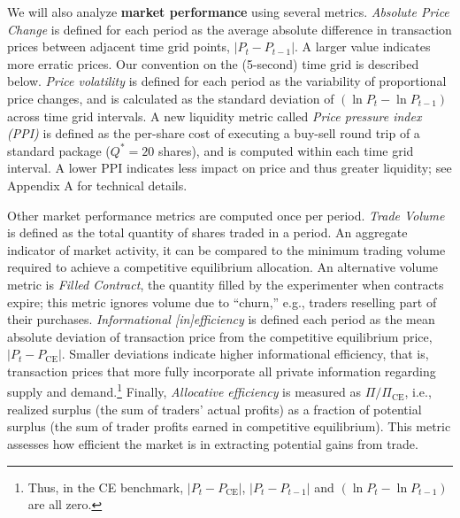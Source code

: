 \documentclass[12pt]{article}
\begin{document}
We will also analyze \textbf{market performance} using several metrics.
\textit{Absolute Price Change} is defined for each period as the average absolute difference in transaction prices between adjacent time grid points, $|P_t - P_{t-1}|$. A larger value indicates more erratic prices. 
Our convention on
the (5-second) time grid is described below. %
\textit{Price volatility} is defined for each period as the variability of proportional price changes, and is calculated as the standard deviation of $(\ln P_t - \ln P_{t-1})$ across time grid intervals.
A new liquidity metric called 
\textit{Price pressure index (PPI)} is defined as the per-share cost of executing a buy-sell round trip of a standard package ($Q^* = 20$ shares),
and is computed within each time grid interval. %
A lower PPI indicates less impact on price and thus greater liquidity; see Appendix A for technical details.  

Other market performance metrics are computed once per period.
\textit{Trade Volume} is defined  as the total quantity of shares traded in a period. An aggregate indicator of market activity, it can be compared to the minimum trading volume required to achieve a competitive equilibrium allocation. An alternative volume metric is \textit{Filled Contract}, the quantity filled by the experimenter when contracts expire; this metric ignores volume due to ``churn,'' e.g.,  traders reselling part of their purchases.
\textit{Informational [in]efficiency} is  defined each period as the mean absolute deviation of transaction price from the  competitive equilibrium price, \( |P_t - P_{\text{CE}}| \). 
Smaller deviations indicate higher informational efficiency, that is, transaction prices that more fully incorporate all private information regarding supply and demand.\footnote{
Thus, in the CE benchmark, \( |P_t - P_{\text{CE}}| \), $|P_t - P_{t-1}|$ and 
$(\ln P_t - \ln P_{t-1})$ are all zero.}
Finally, \textit{Allocative efficiency} is measured as \( \Pi/\Pi_{\text{CE}}\), i.e.,
 realized surplus (the sum of traders' actual profits) as a fraction of potential surplus (the sum of trader profits earned in competitive equilibrium). 
This metric assesses how efficient the market is in extracting potential gains from trade.       


\end{document}
